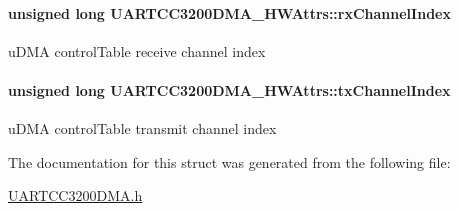 \paragraph[{rx\+Channel\+Index}]{\setlength{\rightskip}{0pt plus 5cm}unsigned long U\+A\+R\+T\+C\+C3200\+D\+M\+A\+\_\+\+H\+W\+Attrs\+::rx\+Channel\+Index}\label{struct_u_a_r_t_c_c3200_d_m_a___h_w_attrs_a5b8677c50e23d1e44924f4b48ea52eea}
u\+D\+M\+A control\+Table receive channel index 
\paragraph[{tx\+Channel\+Index}]{\setlength{\rightskip}{0pt plus 5cm}unsigned long U\+A\+R\+T\+C\+C3200\+D\+M\+A\+\_\+\+H\+W\+Attrs\+::tx\+Channel\+Index}\label{struct_u_a_r_t_c_c3200_d_m_a___h_w_attrs_ad61da692da76e9147c1d6eb2bc90669c}
u\+D\+M\+A control\+Table transmit channel index 

The documentation for this struct was generated from the following file\+:\begin{DoxyCompactItemize}
\item 
\hyperlink{_u_a_r_t_c_c3200_d_m_a_8h}{U\+A\+R\+T\+C\+C3200\+D\+M\+A.\+h}\end{DoxyCompactItemize}
